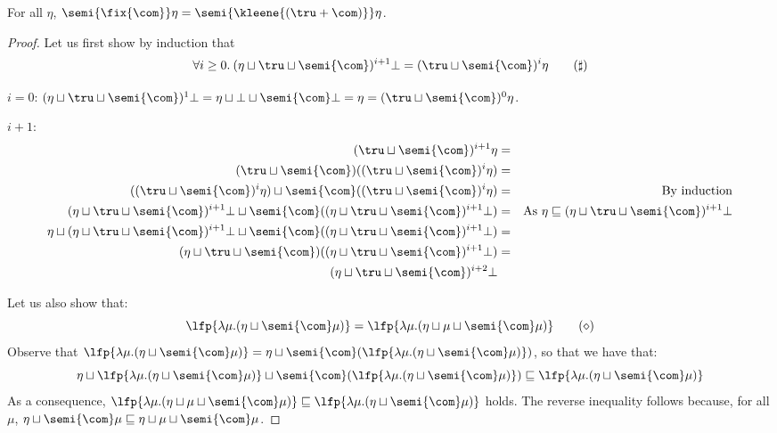 \begin{lemma}\label{lemma-ss}
  For all \(\eta\),
  \(\semi{\fix{\com}} \eta = \semi{\kleene{(\tru + \com)}} \eta\).
\end{lemma}

\begin{proof}
  Let us first show by induction that 
  \begin{equation}\label{prop2}
    \forall i\geq 0.\: (\eta \sqcup \tru \sqcup \semi{\com})^{i+1} \bot = (\tru \sqcup \semi{\com})^{i} \eta \tag{\(\sharp\)}
  \end{equation}

  \noindent
  \(i=0\): \( (\eta \sqcup \tru \sqcup \semi{\com})^{1} \bot = \eta \sqcup \bot \sqcup \semi{\com}\bot = \eta = 
  (\tru \sqcup \semi{\com})^{0} \eta\).
  
  \noindent
  \(i+1\):  
  \begin{align*}
    (\tru \sqcup \semi{\com})^{i+1} \eta & = & \\
    (\tru \sqcup \semi{\com})((\tru \sqcup \semi{\com})^{i} \eta) & = & \\
    ((\tru \sqcup \semi{\com})^{i} \eta) \sqcup  \semi{\com}((\tru \sqcup \semi{\com})^{i} \eta) & = & \text{By induction}\\
    (\eta \sqcup \tru \sqcup \semi{\com})^{i+1} \bot \sqcup \semi{\com}((\eta \sqcup \tru \sqcup \semi{\com})^{i+1}\bot ) &= & \text{As } \eta \sqsubseteq (\eta \sqcup \tru \sqcup \semi{\com})^{i+1} \bot \\
    \eta \sqcup (\eta \sqcup \tru \sqcup \semi{\com})^{i+1} \bot \sqcup \semi{\com}((\eta \sqcup \tru \sqcup \semi{\com})^{i+1}\bot ) & = & \\
    (\eta \sqcup \tru \sqcup \semi{\com}) ((\eta \sqcup \tru \sqcup \semi{\com})^{i+1} \bot) & = & \\
    (\eta \sqcup \tru \sqcup \semi{\com})^{i+2} \bot & &
  \end{align*}

  Let us also show that:
  \begin{equation}\label{prop3}
    \lfp{\lambda \mu. (\eta \sqcup \semi{\com} \mu)} =
    \lfp{\lambda \mu. (\eta \sqcup \mu \sqcup \semi{\com} \mu)}\tag{\(\diamond\)}
  \end{equation}
  Observe that \(\lfp{\lambda \mu. (\eta \sqcup \semi{\com} \mu)} = \eta \sqcup  \semi{\com}(\lfp{\lambda \mu. (\eta \sqcup \semi{\com} \mu)})\), so that we have that:
  \[
  \eta \sqcup  \lfp{\lambda \mu. (\eta \sqcup \semi{\com} \mu)} \sqcup \semi{\com}(\lfp{\lambda \mu. (\eta \sqcup \semi{\com} \mu)})
  \sqsubseteq \lfp{\lambda \mu. (\eta \sqcup \semi{\com} \mu)}
  \]
  As a consequence, \(\lfp{\lambda \mu. (\eta \sqcup \mu \sqcup \semi{\com} \mu)}\sqsubseteq \lfp{\lambda \mu. (\eta \sqcup \semi{\com} \mu)}\) holds. The reverse inequality follows because, for all \(\mu\), 
  \(\eta \sqcup \semi{\com} \mu \sqsubseteq \eta \sqcup \mu \sqcup \semi{\com} \mu\).


\end{proof}
